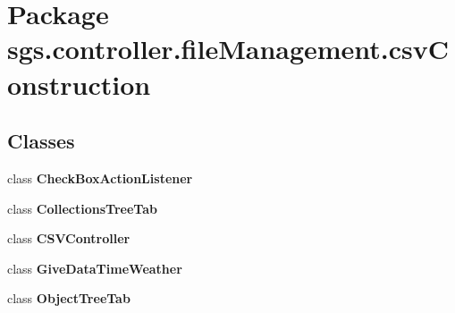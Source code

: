 \section{Package sgs.\-controller.\-file\-Management.\-csv\-Construction}
\label{namespacesgs_1_1controller_1_1file_management_1_1csv_construction}
\subsection*{Classes}
\begin{DoxyCompactItemize}
\item 
class {\bf Check\-Box\-Action\-Listener}
\item 
class {\bf Collections\-Tree\-Tab}
\item 
class {\bf C\-S\-V\-Controller}
\item 
class {\bf Give\-Data\-Time\-Weather}
\item 
class {\bf Object\-Tree\-Tab}
\end{DoxyCompactItemize}
